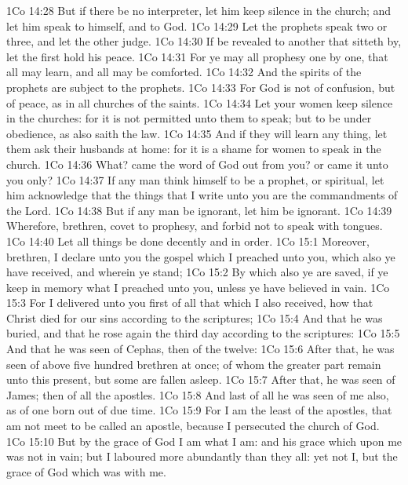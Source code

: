 \vs 1Co 14:28 But if there be no interpreter, let him keep silence in the church; and let him speak to himself, and to God.
\vs 1Co 14:29 Let the prophets speak two or three, and let the other judge.
\vs 1Co 14:30 If  be revealed to another that sitteth by, let the first hold his peace.
\vs 1Co 14:31 For ye may all prophesy one by one, that all may learn, and all may be comforted.
\vs 1Co 14:32 And the spirits of the prophets are subject to the prophets.
\vs 1Co 14:33 For God is not  of confusion, but of peace, as in all churches of the saints.
\vs 1Co 14:34 Let your women keep silence in the churches: for it is not permitted unto them to speak; but  to be under obedience, as also saith the law.
\vs 1Co 14:35 And if they will learn any thing, let them ask their husbands at home: for it is a shame for women to speak in the church.
\vs 1Co 14:36 What? came the word of God out from you? or came it unto you only?
\vs 1Co 14:37 If any man think himself to be a prophet, or spiritual, let him acknowledge that the things that I write unto you are the commandments of the Lord.
\vs 1Co 14:38 But if any man be ignorant, let him be ignorant.
\vs 1Co 14:39 Wherefore, brethren, covet to prophesy, and forbid not to speak with tongues.
\vs 1Co 14:40 Let all things be done decently and in order.
\vs 1Co 15:1 Moreover, brethren, I declare unto you the gospel which I preached unto you, which also ye have received, and wherein ye stand;
\vs 1Co 15:2 By which also ye are saved, if ye keep in memory what I preached unto you, unless ye have believed in vain.
\vs 1Co 15:3 For I delivered unto you first of all that which I also received, how that Christ died for our sins according to the scriptures;
\vs 1Co 15:4 And that he was buried, and that he rose again the third day according to the scriptures:
\vs 1Co 15:5 And that he was seen of Cephas, then of the twelve:
\vs 1Co 15:6 After that, he was seen of above five hundred brethren at once; of whom the greater part remain unto this present, but some are fallen asleep.
\vs 1Co 15:7 After that, he was seen of James; then of all the apostles.
\vs 1Co 15:8 And last of all he was seen of me also, as of one born out of due time.
\vs 1Co 15:9 For I am the least of the apostles, that am not meet to be called an apostle, because I persecuted the church of God.
\vs 1Co 15:10 But by the grace of God I am what I am: and his grace which  upon me was not in vain; but I laboured more abundantly than they all: yet not I, but the grace of God which was with me.
